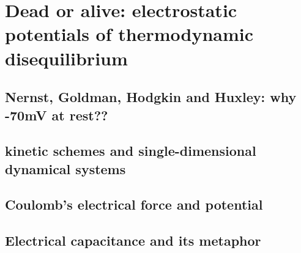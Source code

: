 \section{Dead or alive: electrostatic potentials of thermodynamic disequilibrium}

\subsection{Nernst, Goldman, Hodgkin and Huxley: why -70mV at rest??}

\subsection{kinetic schemes and single-dimensional dynamical systems}

\subsection{Coulomb’s electrical force and potential}
\subsection{Electrical capacitance and its metaphor}